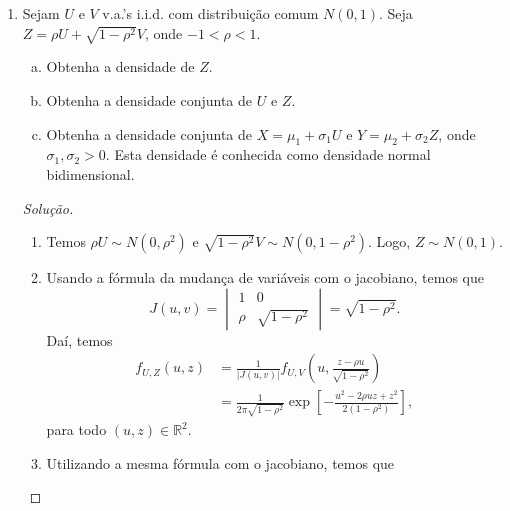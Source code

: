 \documentclass[../Notas.tex]{subfiles}
\begin{document}
\begin{enumerate}
\begin{proof}[Solução]
        estritamente decrescente e derivável nesse intervalo, de modo que podemos usar a mudança de
        variáveis para obter
        \[
        f_Z(z) = \frac{1}{z^2}\cdot\frac{\Gamma(\alpha_1+\alpha_2)}{\Gamma(\alpha_1)\Gamma(\alpha_2)}
        \cdot\frac{(1-z)^{\alpha_2-1}z^{1 - \alpha_2}}{z^{-\alpha_1-\alpha_2}}
        = \frac{\Gamma(\alpha_1+\alpha_2)}{\Gamma(\alpha_1)\Gamma(\alpha_2)}
        z^{\alpha_1-1}(1-z)^{\alpha_2-1}
        \]
        para $0<z<1$ e $f_Z(z) = 0$ caso contrário.
    \end{proof}
    \item Sejam $U$ e $V$ v.a.’s i.i.d. com distribuição comum $N(0,1)$. Seja $Z = \rho U + \sqrt{1-\rho^2} V$, onde $-1 < \rho < 1$.
    \begin{enumerate}[a)]
    \item Obtenha a densidade de $Z$.
    \item Obtenha a densidade conjunta de $U$ e $Z$.
    \item Obtenha a densidade conjunta de $X = \mu_1 + \sigma_1 U$ e $Y = \mu_2 + \sigma_2 Z$, onde $\sigma_1, \sigma_2 > 0$. Esta densidade é conhecida como densidade normal bidimensional.
    \end{enumerate}
    \begin{proof}[Solução]
        \begin{enumerate}
            \item Temos $\rho U\sim N(0, \rho^2)$ e $\sqrt{1-\rho^2}V \sim N(0, 1-\rho^2)$. Logo,
            $Z\sim N(0,1)$.
            \item Usando a fórmula da mudança de variáveis com o jacobiano, temos que
            \[
            J(u,v) = \begin{vmatrix}
            1 & 0 \\
            \rho & \sqrt{1-\rho^2}
            \end{vmatrix} = \sqrt{1-\rho^2}.
            \]
            Daí, temos
            \begin{align*}
                f_{U,Z}(u,z) &= \frac{1}{|J(u,v)|}f_{U,V}\left(u,\frac{z-\rho u}{\sqrt{1-\rho^2}}\right)\\
                             &= \frac{1}{2\pi\sqrt{1-\rho^2}}
                             \exp\left[-\frac{u^2-2\rho uz + z^2}{2(1-\rho^2)} \right],
            \end{align*}
            para todo $(u,z)\in\mathbb{R}^2$.
            \item Utilizando a mesma fórmula com o jacobiano, temos que

\end{enumerate}
\end{proof}
\end{enumerate}
\end{document}
